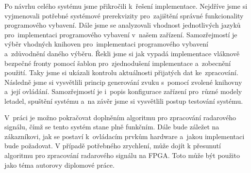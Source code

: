 	Po návrhu celého systému jsme přikročili k~řešení implementace. Nejdříve jsme si vyjmenovali potřebné systémové prerekvizity pro~zajištění správné funkcionality programového vybavení. Dále jsme se analyzovali vhodnost jednotlivých jazyků pro~implementaci programového vybavení v~našem zařízení. Samozřejmostí je výběr vhodných knihoven pro~implementaci programového vybavení a~zdůvodnění daného výběru. Řekli jsme si jak vypadá implementace vláknově bezpečné fronty pomocí šablon pro~zjednodušení implementace a~zobecnění použití. Taky jsme si ukázali kontrolu aktuálnosti přijatých dat ke~zpracování. Následně jsme si vysvětlili princip generování zvuku s~pomocí zvolené knihovny a~její ovládání. Samozřejmostí je i~popis konfigurace zařízení pro~různé modely letadel, spuštění systému a~na závěr jsme si vysvětlili postup testování systému.\par
	V~práci je možno pokračovat doplněním algoritmu pro zpracování radarového signálu, čímž se tento systém stane plně funkčním. Dále bude záležet na zákazníkovi, jak se postaví k~ovládacím prvkům hardware a~jakou implementaci bude požadovat. V případě potřebného zrychlení, může dojít k přesunutí algoritmu pro zpracování radarového signálu na FPGA. Toto může být použito jako téma autorovy diplomové práce.
	

